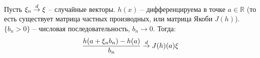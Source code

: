 \documentclass[document.tex]{subfiles}
\begin{document}
\begin{theorem}
	Пусть $\xi_n \stackrel{d}{\rightarrow} \xi$ -- случайные векторы. $h(x)$ -- дифференцируема в точке $a \in \mathbb{R}$ (то есть существует матрица частных производных, или матрица Якоби $J(h)$). $\{b_n > 0\}$ -- числовая последовательность, $b_n \rightarrow 0$. Тогда:
	$$\frac{h(a + \xi_n b_n) - h(a)}{b_n} \stackrel{d}{\rightarrow} J(h)(a) \xi$$
\end{theorem}
\end{document}
